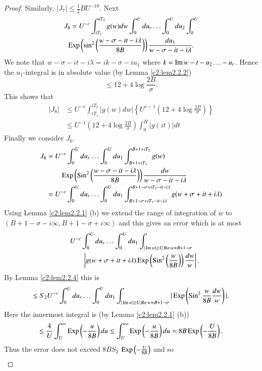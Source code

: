 \begin{proof}
Similarly, $|J_7| \leq \frac{1}{2} B U^{-10}$. Next
\begin{gather*}
J_8 = U^{-r} \int^{iT_2}_{iT_1} g(w) dw \int^U_0 du_r \ldots \int^U_0 du_2 \int^U_0\\
\operatorname{Exp} \left(\sin^2 \left(\frac{w - \sigma - it - i \lambda}{8B} \right) \right) \frac{du_1}{w - \sigma - it -i \lambda}.
\end{gather*}\pageoriginale
We note that $w - \sigma - it - i \lambda = i k - \sigma - iu_1$ where $k = \operatorname{Im} w - t -u_2 \ldots - u_r$. Hence the $u_1$-integral is in absolute value (by Lemma \ref{c2:lem2.2.2})
$$
\leq 12 + 4 \log \frac{2B}{\sigma}.
$$
This shows that
\begin{align*}
|J_8| & \leq U^{-r} \int^{iT_2}_{iT_1} |g(w) dw| \left\{ U^{r-1} (12 + 4 \log \frac{2B}{\sigma})\right\}\\
& \leq U^{-1} (12 + 4 \log \frac{2B}{\sigma}) \int^H_0 |g(it)| dt
\end{align*}
Finally we consider $J_6$.
\begin{align*}
J_6 & = U^{-r} \int^U_0 du_r \ldots \int^U_0 du_1
\int^{B+1+iT_2}_{B+1+iT_1} g(w)\\ 
&\qquad\operatorname{Exp} \left(\operatorname{Sin}^2 \left(\frac{w-\sigma - it - i \lambda}{8B} \right) \right) \frac{dw}{w -\sigma - it -i\lambda}\\
& = U^{-r} \int^U_0du_r \ldots \int^U_0 du_1 \int^{B+1-\sigma + iT_2 - it -i\lambda}_{B+1-\sigma + iT_1 - it - i \lambda} g(w+ \sigma + it + i\lambda)
\end{align*}
Using Lemma \ref{c2:lem2.2.1} (b) we extend the range of integration of $w$ to $(B+1-\sigma - i \infty, B + 1 - \sigma + i\infty)$ and this gives an error which is at most
\begin{gather*}
U^{-r} \int^U_0 du_r \ldots \int^U_0 du_1 \int_{|\operatorname{Im} w| \geq U, \operatorname{Re} w
  = B + 1 -\sigma}\\ 
\qquad\quad\left|g(w+ \sigma + it + i \lambda) \operatorname{Exp} \left(\operatorname{Sin}^2 \left(\frac{w}{8B} \right)\right) \frac{dw}{w}\right|.
\end{gather*}
By Lemma \ref{c2:lem2.2.4} this is
$$
\leq S_2 U^{-r} \int^U_0 du_r \ldots \int^U_0 du_1 \int_{|\operatorname{Im} w | \geq U, \operatorname{Re} w =B+1 -\sigma} |\operatorname{Exp} \left(\operatorname{Sin}^2 \frac{w}{8B} \frac{dw}{w}\right)|.
$$
Here the innermost integral is (by Lemma \ref{c2:lem2.2.1} (b)) 
$$
\leq \frac{4}{U} \int^\infty_U\operatorname{Exp} \left( - \frac{u}{8B} \right) du \leq \int^\infty_U \operatorname{Exp} \left( -\frac{u}{8B}\right) du = 8B \operatorname{Exp} \left(-\frac{U}{8B} \right).
$$
Thus the error does not exceed $8BS_2$ $\operatorname{Exp} \left( -\frac{U}{8B}\right)$ and so
\begin{align*}

\end{align*}
\end{proof}
